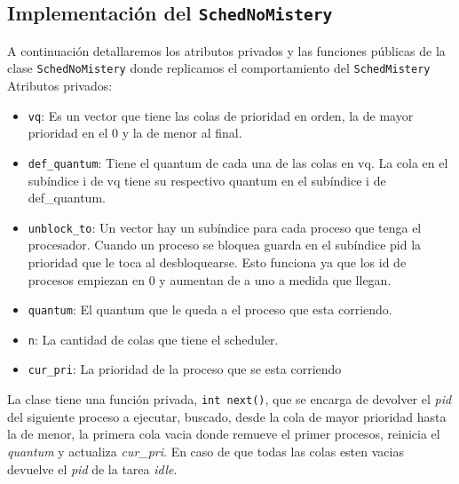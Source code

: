 \subsection{Implementación del \texttt{SchedNoMistery}}
\newline A continuación detallaremos los atributos privados y las funciones públicas de la clase \texttt{SchedNoMistery} donde replicamos el comportamiento del \texttt{SchedMistery}
Atributos privados:
\begin{itemize}
	\item \texttt{vq}: Es un vector que tiene las colas de prioridad en orden, la de mayor prioridad en el 0 y la de menor al final.
	\item \texttt{def\_quantum}: Tiene el quantum de cada una de las colas en vq. La cola en el subíndice i de vq tiene su respectivo quantum en el subíndice i de def\_quantum. 
	\item \texttt{unblock\_to}: Un vector hay un subíndice para cada proceso que tenga el procesador. Cuando un proceso se bloquea guarda en el subíndice pid la prioridad que le toca al desbloquearse. Esto funciona ya que los id de procesos empiezan en 0 y aumentan de a uno a medida que llegan.
	\item \texttt{quantum}: El quantum que le queda a el proceso que esta corriendo.
	\item \texttt{n}: La  cantidad de colas que tiene el scheduler.
	\item \texttt{cur\_pri}: La prioridad de la proceso que se esta corriendo
\end{itemize}

La clase tiene una función privada, \texttt{int next()}, que se encarga de devolver el \emph{pid} del siguiente proceso a ejecutar, buscado, desde la cola de mayor prioridad hasta la de menor, la primera cola vacia donde remueve el primer procesos, reinicia el \emph{quantum} y actualiza \emph{cur\_pri}. En caso de que todas las colas esten vacias devuelve el \emph{pid} de la tarea \emph{idle}. \\

